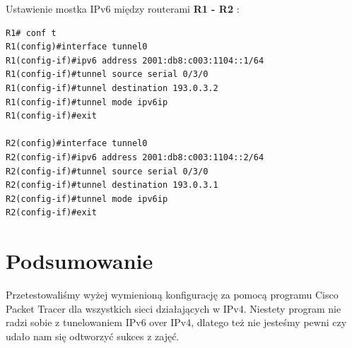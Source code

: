 \documentclass[11pt,a4paper]{article}
\begin{document}
Ustawienie mostka IPv6 między routerami {\bf R1 - R2} :
\begin{lstlisting}
R1# conf t
R1(config)#interface tunnel0	
R1(config-if)#ipv6 address 2001:db8:c003:1104::1/64
R1(config-if)#tunnel source serial 0/3/0
R1(config-if)#tunnel destination 193.0.3.2
R1(config-if)#tunnel mode ipv6ip
R1(config-if)#exit 

R2(config)#interface tunnel0	
R2(config-if)#ipv6 address 2001:db8:c003:1104::2/64
R2(config-if)#tunnel source serial 0/3/0
R2(config-if)#tunnel destination 193.0.3.1
R2(config-if)#tunnel mode ipv6ip
R2(config-if)#exit 

\end{lstlisting}

\section{Podsumowanie}
Przetestowaliśmy wyżej wymienioną konfigurację za pomocą programu Cisco Packet Tracer dla wszystkich sieci działających w IPv4. Niestety program nie radzi sobie z tunelowaniem IPv6 over IPv4, dlatego też nie jesteśmy pewni czy udało nam się odtworzyć sukces z zajęć. 
\end{document}
